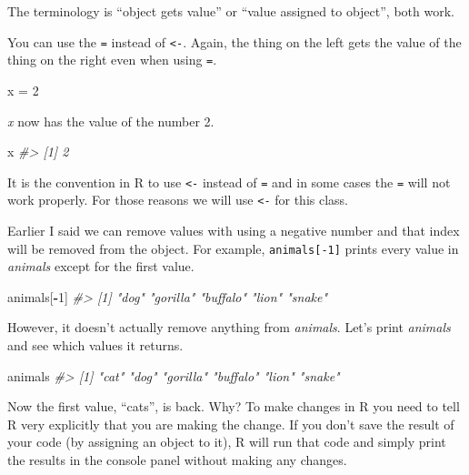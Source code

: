 \documentclass[
  12pt,
]{book}
\newenvironment{Shaded}{\begin{snugshade}}{\end{snugshade}}
\newcommand{\CommentTok}[1]{\textcolor[rgb]{0.37,0.37,0.37}{\textit{#1}}}
\newcommand{\DecValTok}[1]{\textcolor[rgb]{0.06,0.06,0.06}{#1}}
\newcommand{\NormalTok}[1]{#1}
\newcommand{\OperatorTok}[1]{\textcolor[rgb]{0.43,0.43,0.43}{\textbf{#1}}}
\newcommand{\StringTok}[1]{\textcolor[rgb]{0.5,0.5,0.5}{#1}}
\begin{document}
The terminology is ``object gets value'' or ``value assigned to object'', both work.

You can use the \texttt{=} instead of \texttt{\textless{}-}. Again, the thing on the left gets the value of the thing on the right even when using \texttt{=}.

\begin{Shaded}
\begin{Highlighting}[]
\NormalTok{x =}\StringTok{ }\DecValTok{2}
\end{Highlighting}
\end{Shaded}

\emph{x} now has the value of the number 2.

\begin{Shaded}
\begin{Highlighting}[]
\NormalTok{x}
\CommentTok{\#\textgreater{} [1] 2}
\end{Highlighting}
\end{Shaded}

It is the convention in R to use \texttt{\textless{}-} instead of \texttt{=} and in some cases the \texttt{=} will not work properly. For those reasons we will use \texttt{\textless{}-} for this class.

Earlier I said we can remove values with using a negative number and that index will be removed from the object. For example, \texttt{animals{[}-1{]}} prints every value in \emph{animals} except for the first value.

\begin{Shaded}
\begin{Highlighting}[]
\NormalTok{animals[}\OperatorTok{{-}}\DecValTok{1}\NormalTok{]}
\CommentTok{\#\textgreater{} [1] "dog"     "gorilla" "buffalo" "lion"    "snake"}
\end{Highlighting}
\end{Shaded}

However, it doesn't actually remove anything from \emph{animals}. Let's print \emph{animals} and see which values it returns.

\begin{Shaded}
\begin{Highlighting}[]
\NormalTok{animals}
\CommentTok{\#\textgreater{} [1] "cat"     "dog"     "gorilla" "buffalo" "lion"    "snake"}
\end{Highlighting}
\end{Shaded}

Now the first value, ``cats'', is back. Why? To make changes in R you need to tell R very explicitly that you are making the change. If you don't save the result of your code (by assigning an object to it), R will run that code and simply print the results in the console panel without making any changes.
\end{document}
